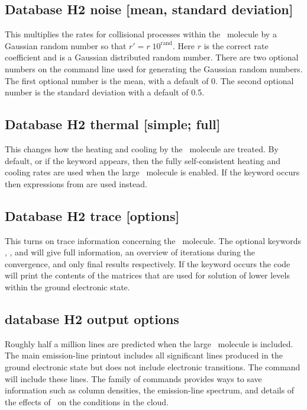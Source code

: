 \subsection{Database H2 noise [mean, standard deviation]}

This multiplies the rates for collisional processes within the \htwo\ molecule
by a Gaussian random number so that $r' = r\;10^{{\mathrm{rand}}} $.
Here $r$
is the correct rate coefficient and  is a Gaussian
distributed random number.  There are two optional numbers on the command
line used for generating the Gaussian random numbers.
The first optional number is the mean, with a default of 0.  The second
optional number is the standard deviation with a default of 0.5.

\subsection{Database H2 thermal [simple; full]}

This changes how the heating and cooling by the \htwo\ molecule
are treated.
By default, or if the keyword  appears,
then the fully self-consistent
heating and cooling rates are used when the large \htwo\ molecule
is enabled.
If the keyword  occurs then expressions
from \citet{Tielens1985a} are used instead.

\subsection{Database H2 trace [options]}

This turns on trace information concerning the \htwo\ molecule.
The optional
keywords , ,
and  will give full information, an overview
of iterations during the convergence, and only final results respectively.
If the keyword  occurs the code will print
the contents of the matrices
that are used for solution of lower levels within the ground electronic
state.

\subsection{database H2 output options}

Roughly half a million lines are predicted when the large
\htwo\ molecule is included.
The main emission-line printout includes all significant lines
produced in the ground electronic state but does not include electronic
transitions.
The  command
will include these lines.
The family of  commands
provides ways to save information such as column densities,
the emission-line spectrum, and details of the effects of \htwo\ on the
conditions in the cloud.

